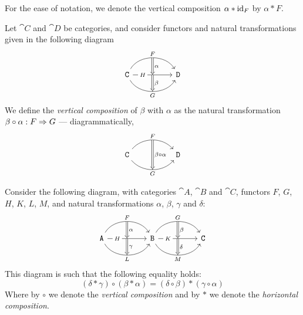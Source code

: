 \begin{notation}
    \label{not:horizontal-composition}
    For the ease of notation, we denote the vertical composition \(\alpha * \operatorname{id}_F\)
    by \(\alpha * F\).
\end{notation}

\begin{definition}
    \label{def:vertical-compostion-natural-transformation}
    Let \(\cat C\) and \(\cat D\) be categories, and consider functors and natural
    transformations given in the following diagram
    \[
        \begin{tikzcd}
            \cat C \ar[rr, bend left=60, "F"{name=F}]
            \ar[rr, "H"{near start, description}, ""'{name=H}, ""{name=HH}]
            \ar[rr, bend right=60, swap, "G"{name=G}]
            & &\cat D
            \ar[Rightarrow, "\alpha", from=F, to=H]
            \ar[Rightarrow, "\beta", from=HH, to=G]
        \end{tikzcd}
    \]
    We define the \emph{vertical composition} of \(\beta\) with \(\alpha\) as the
    natural transformation \(\beta \circ \alpha: F \Rightarrow G\) --- diagrammatically,
    \[
        \begin{tikzcd}
            \cat C \ar[rr, bend left=50, "F"{name=F}]
            \ar[rr, bend right=50, swap, "G"{name=G}]
            &&\cat D
            \ar[Rightarrow, "\beta \circ \alpha", from=F, to=G]
        \end{tikzcd}
    \]
\end{definition}

\begin{proposition}
    \label{prop:mixing-vertical-and-horizontal-compositions}
    Consider the following diagram, with categories \(\cat A\), \(\cat B\) and
    \(\cat C\), functors \(F\), \(G\), \(H\), \(K\), \(L\), \(M\), and natural
    transformations \(\alpha\), \(\beta\), \(\gamma\) and \(\delta\):
    \[
        \begin{tikzcd}
            \cat A
            \ar[rr, bend left=60, "F"{name=F}]
            \ar[rr, "H"{description, near start}, ""'{name=H}, ""{name=HH}]
            \ar[rr, bend right=60, "L"'{name=L}]
            && \cat B
            \ar[rr, bend left=60, "G"{name=G}]
            \ar[rr, "K"{description, near start}, ""'{name=K}, ""{name=KK}]
            \ar[rr, bend right=60, "M"'{name=M}]
            &&\cat C
            \ar[Rightarrow, "\alpha", from=F, to=H]
            \ar[Rightarrow, from=HH, to=L, "\gamma"]
            \ar[Rightarrow, "\beta", from=G, to=K]
            \ar[Rightarrow, from=KK, to=M, "\delta"]
        \end{tikzcd}
    \]
    This diagram is such that the following equality holds:
    \[
        (\delta * \gamma) \circ (\beta * \alpha)
        = (\delta \circ \beta) * (\gamma \circ \alpha)
    \]
    Where by \(\circ\) we denote the \emph{vertical composition} and by \(*\) we
    denote the \emph{horizontal composition}.
\end{proposition}

